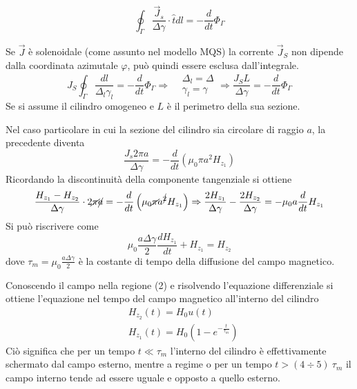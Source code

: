 $$
\oint_\Gamma \frac{\vec{J}_s}{\Delta\gamma} \cdot\hat{t}dl = -\frac{d}{dt} \Phi_\Gamma
$$

Se $\vec{J}$ è solenoidale (come assunto nel modello MQS) la corrente $\vec{J}_S$ non 
dipende dalla coordinata azimutale $\varphi$, può quindi essere esclusa dall'integrale.
$$
J_S\oint_\Gamma\frac{dl}{\Delta_l\gamma_l} = -\frac{d}{dt}\Phi_\Gamma \Rightarrow
\begin{aligned}
&\Delta_l = \Delta\\
&\gamma_l = \gamma
\end{aligned}
\Rightarrow \frac{J_S L}{\Delta\gamma} = -\frac{d}{dt}\Phi_\Gamma
$$
Se si assume il cilindro omogeneo e $L$ è il perimetro della sua sezione.

Nel caso particolare in cui la sezione del cilindro sia circolare di raggio $a$, la precedente diventa
$$
\frac{J_s 2\pi a}{\Delta\gamma} = -\frac{d}{dt}\left(\mu_0\pi a^2 H_{z_1}\right)
$$
Ricordando la discontinuità della componente tangenziale si ottiene
$$
\frac{H_{z_1} - H_{z_2}}{\Delta\gamma}\cdot 2\cancel{\pi} \cancel{a} = -\frac{d}{dt} \left(\mu_0 \cancel{\pi}a^{\cancel{2}}H_{z_1}\right) \Rightarrow \frac{2H_{z_1}}{\Delta\gamma} - \frac{2H_{z_2}}{\Delta\gamma} = -\mu_0 a \frac{d}{dt}H_{z_1}
$$
Si può riscrivere come
$$
\mu_0\frac{a\Delta\gamma}{2}\frac{dH_{z_1}}{dt} + H_{z_1} = H_{z_2}
$$
dove $\tau_m =  \mu_0\frac{a\Delta\gamma}{2}$ è la costante di tempo della diffusione 
del campo magnetico.

Conoscendo il campo nella regione (2) e risolvendo l'equazione differenziale si ottiene 
l'equazione nel tempo del campo magnetico all'interno del cilindro
$$
\begin{aligned}
& H_{z_2}(t) = H_0u(t)\\
& H_{z_1}(t) = H_0\left(1-e^{-\frac{t}{\tau_m}}\right)
\end{aligned}
$$
Ciò significa che per un tempo $t\ll \tau_m$ l'interno del cilindro è effettivamente 
schermato dal campo esterno, mentre a regime o per un tempo $t > (4\div5)\ \tau_m$ il campo
interno tende ad essere uguale e opposto a quello esterno.
